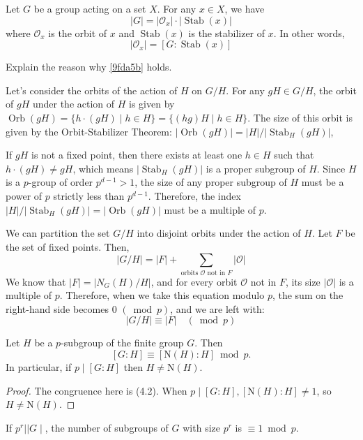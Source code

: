 \begin{theorem}
Let $G$ be a group acting on a set $X$. For any $x \in X$, we have
\[
|G| = |\mathcal{O}_x| \cdot |\operatorname{Stab}(x)|
\]where $\mathcal{O}_x$ is the orbit of $x$ and $\operatorname{Stab}(x)$ is the stabilizer of $x$. In other words,
\[
|\mathcal{O}_x| = [G : \operatorname{Stab}(x)]
\]
\end{theorem}
Explain the reason why \cref{9fda5b} holds.

Let's consider the orbits of the action of $H$ on $G / H$. For any $g H \in G / H$, the orbit of $g H$ under the action of $H$ is given by $\operatorname{Orb}(g H)=\{h \cdot(g H) \mid h \in H\}=\{(h g) H \mid h \in H\}$. The size of this orbit is given by the Orbit-Stabilizer Theorem: $|\operatorname{Orb}(g H)|=|H| /\left|\operatorname{Stab}_H(g H)\right|$,

If $g H$ is not a fixed point, then there exists at least one $h \in H$ such that $h \cdot(g H) \neq g H$, which means $\left|\operatorname{Stab}_H(g H)\right|$ is a proper subgroup of $H$. Since $H$ is a $p$-group of order $p^{d-1}>1$, the size of any proper subgroup of $H$ must be a power of $p$ strictly less than $p^{d-1}$. Therefore, the index $|H| /\left|\operatorname{Stab}_H(g H)\right|=|\operatorname{Orb}(g H)|$ must be a multiple of $p$.

We can partition the set $G / H$ into disjoint orbits under the action of $H$. Let $F$ be the set of fixed points. Then,
\[
|G / H|=|F|+\sum_{\text {orbits } \mathcal{O} \text { not in } F}|\mathcal{O}|
\]
We know that $|F|=\left|N_G(H) / H\right|$, and for every orbit $\mathcal{O}$ not in $F$, its size $|\mathcal{O}|$ is a multiple of $p$. Therefore, when we take this equation modulo $p$, the sum on the right-hand side becomes 0 $(\bmod p)$, and we are left with:
\[
|G / H| \equiv|F| \quad(\bmod p)
\]
\begin{corollary}
Let $H$ be a $p$-subgroup of the finite group $G$. Then
\[
[G: H] \equiv[\mathrm{N}(H): H] \bmod p .
\]In particular, if $p \mid[G: H]$ then $H \neq \mathrm{N}(H)$.
\end{corollary}
\begin{proof}
The congruence here is (4.2). When $p \mid[G: H],[\mathrm{N}(H): H] \neq 1$, so $H \neq \mathrm{N}(H)$.
\end{proof}

\begin{theorem}[Frobenius]
If $p^r| | G \mid$, the number of subgroups of $G$ with size $p^r$ is $\equiv 1 \bmod p$.
\end{theorem}